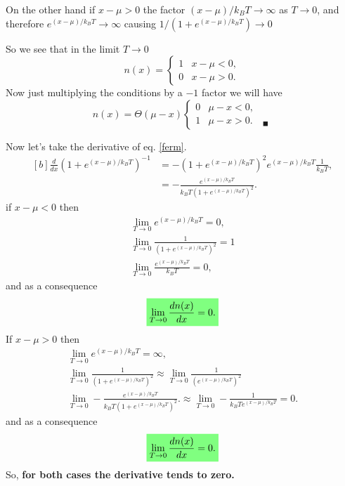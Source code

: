 \begin{questions}
\begin{solution}
  On the other hand if $x-\mu > 0$ the factor $(x-\mu)/k_B T \rightarrow  \infty$ as $T\rightarrow0$, and therefore $e^{(x-\mu)/k_B T} \rightarrow \infty $ causing $1/(1+ e^{(x-\mu)/k_B T}) \rightarrow 0$

  So we see that in the limit $T\rightarrow0$
  \begin{equation}
    n(x) =
    \begin{cases}
      1 & x - \mu < 0, \\
      0 & x - \mu > 0.
   \end{cases}
  \end{equation}
  Now just multiplying the conditions by a $-1$ factor we will have
  \begin{equation}
    n(x) = \Theta (\mu - x)
    \begin{cases}
      0 & \mu - x < 0,\\
      1 & \mu - x > 0.  \quad_\blacksquare
   \end{cases}
  \end{equation}

  Now let's take the derivative of eq. \ref{ferm}.
  \begin{equation}
    \begin{aligned}[b]
      \frac{d}{dx} \left(1+ e^{(x-\mu)/k_B T}\right)^{-1} &= -(1+ e^{(x-\mu)/k_B T})^2e^{(x-\mu)/k_B T}\frac{1}{k_BT}, \\
      &= -\frac{e^{(x-\mu)/k_B T}}{k_BT (1+ e^{(x-\mu)/k_B T})^2}.
    \end{aligned}
  \end{equation}
  if $x-\mu < 0$ then
  \begin{eqnarray}
    \lim_{T\rightarrow 0} e^{(x-\mu)/k_B T} = 0,\\
    \lim_{T\rightarrow 0} \frac{1}{(1+ e^{(x-\mu)/k_B T})^2} = 1\\
    \lim_{T\rightarrow 0} \frac{e^{(x-\mu)/k_B T}}{k_BT } = 0,
  \end{eqnarray}
  and as a consequence
  \begin{eqnarray}
    \hlgreen{\lim_{T\rightarrow 0} \frac{dn(x)}{dx} = 0.}
  \end{eqnarray}
  If $x-\mu > 0$ then
  \begin{eqnarray}
    \lim_{T\rightarrow 0} e^{(x-\mu)/k_B T} = \infty,\\
    \lim_{T\rightarrow 0} \frac{1}{(1+ e^{(x-\mu)/k_B T})^2} \approx \lim_{T\rightarrow 0} \frac{1}{(e^{(x-\mu)/k_B T})^2} \\
    \lim_{T\rightarrow 0} -\frac{e^{(x-\mu)/k_B T}}{k_BT (1+ e^{(x-\mu)/k_B T})^2}. \approx \lim_{T\rightarrow 0} -\frac{1}{k_BTe^{(x-\mu)/k_B T}} = 0.
  \end{eqnarray}
  and as a consequence
  \begin{eqnarray}
    \hlgreen{\lim_{T\rightarrow 0} \frac{dn(x)}{dx} = 0.}
  \end{eqnarray}
  So, \textbf{for both cases the derivative tends to zero.}
\end{solution}
\end{questions}

%
%
